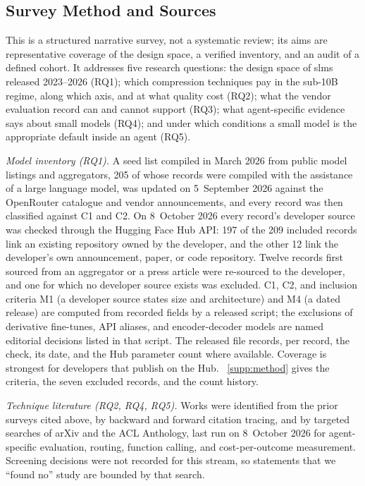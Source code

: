 \subsection{Survey Method and Sources}
\label{subsec:intro_method}

This is a structured narrative survey, not a systematic review; its aims are representative coverage of the design space, a verified inventory, and an audit of a defined cohort. It addresses five research questions: the design space of \glspl{slm} released 2023--2026 (RQ1); which compression techniques pay in the sub-10B regime, along which axis, and at what quality cost (RQ2); what the vendor evaluation record can and cannot support (RQ3); what agent-specific evidence says about small models (RQ4); and under which conditions a small model is the appropriate default inside an agent (RQ5).
\label{subsubsec:intro_rqs}
\label{subsubsec:intro_search}

\emph{Model inventory (RQ1).} A seed list compiled in March 2026 from public model listings and aggregators, 205 of whose records were compiled with the assistance of a large language model, was updated on 5~September 2026 against the OpenRouter catalogue and vendor announcements, and every record was then classified against C1 and C2. On 8~October 2026 every record's developer source was checked through the Hugging Face Hub API: 197 of the 209 included records link an existing repository owned by the developer, and the other 12 link the developer's own announcement, paper, or code repository. Twelve records first sourced from an aggregator or a press article were re-sourced to the developer, and one for which no developer source exists was excluded. C1, C2, and inclusion criteria M1 (a developer source states size and architecture) and M4 (a dated release) are computed from recorded fields by a released script; the exclusions of derivative fine-tunes, API aliases, and encoder-decoder models are named editorial decisions listed in that script. The released file records, per record, the check, its date, and the Hub parameter count where available. Coverage is strongest for developers that publish on the Hub. \suppsec~\ref{supp:method} gives the criteria, the seven excluded records, and the count history.

\emph{Technique literature (RQ2, RQ4, RQ5).} Works were identified from the prior surveys cited above, by backward and forward citation tracing, and by targeted searches of arXiv and the ACL Anthology, last run on 8~October 2026 for agent-specific evaluation, routing, function calling, and cost-per-outcome measurement. Screening decisions were not recorded for this stream, so statements that we ``found no'' study are bounded by that search.

